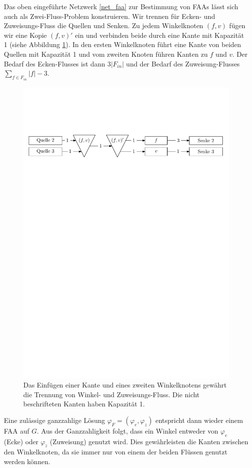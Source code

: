 \begin{remark}

Das oben eingeführte Netzwerk \ref{net_faa} zur Bestimmung von FAAs lässt sich auch als Zwei-Fluss-Problem konstruieren. Wir trennen für Ecken- und Zuweisungs-Fluss die Quellen und Senken.  Zu jedem Winkelknoten $(f,v)$ fügen wir eine Kopie $(f,v)'$ ein und verbinden beide durch eine Kante mit Kapazität 1 (siehe Abbildung \ref{faa_as_2}). In den ersten Winkelknoten führt eine Kante von beiden Quellen mit Kapazität 1 und vom zweiten Knoten führen Kanten zu $f$ und $v$. Der Bedarf des Ecken-Flusses ist dann $3|F_{in}|$ und der Bedarf des Zuweisung-Flusses $\sum_{f \in F_{in}}{|f|-3}$.

\begin{figure}[h]
	\centering
  \includegraphics[width=1\textwidth]{faa_2_flow.pdf}
  \caption{Das Einfügen einer Kante und eines zweiten Winkelknotens gewährt die Trennung von Winkel- und Zuweisungs-Fluss. Die nicht beschrifteten Kanten haben Kapazität 1.}
  \label{faa_as_2}
\end{figure}

Eine zulässige ganzzahlige Lösung $\varphi_F = (\varphi_e,\varphi_z)$ entspricht dann wieder einem FAA auf $G$. Aus der Ganzzahligkeit folgt, dass ein Winkel entweder von $\varphi_{e}$ (Ecke) oder $\varphi_{z}$ (Zuweisung) genutzt wird. Dies gewährleisten die Kanten zwischen den Winkelknoten, da sie immer nur von einem der beiden Flüssen genutzt werden können.
\end{remark}

